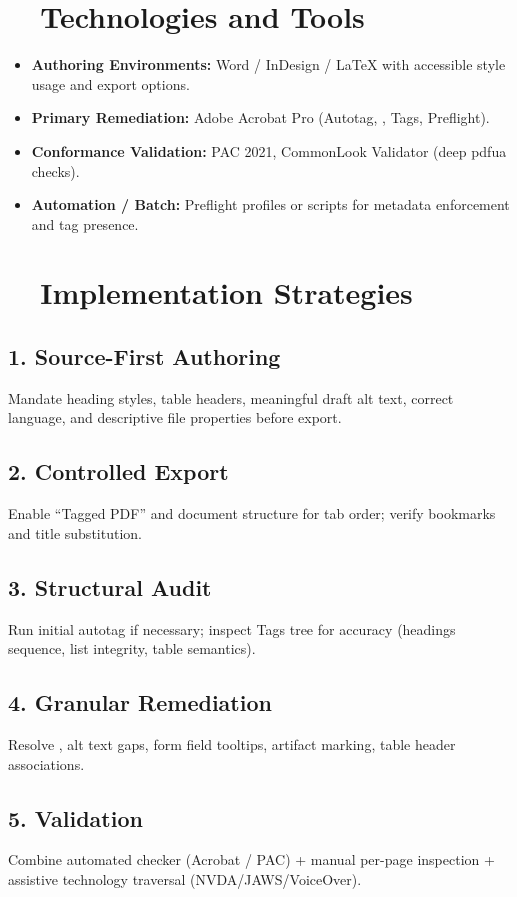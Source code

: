 \section{~~Technologies and Tools}\label{ch18:sec:technologies-tools}
\begin{itemize}
	\item \textbf{Authoring Environments:} Word / InDesign / LaTeX with accessible style usage and export options.
	\item \textbf{Primary Remediation:} Adobe Acrobat Pro (Autotag, , Tags, Preflight)\supercite{AdobeAccessGuide}.
	\item \textbf{Conformance Validation:} PAC 2021, CommonLook Validator (deep \gls{pdfua} checks)\supercite{PubComWCAGvsPDFUA}.
	\item \textbf{Automation / Batch:} Preflight profiles or scripts for metadata enforcement and tag presence.
\end{itemize}

\section{~~Implementation Strategies}\label{ch18:sec:implementation-strategies}
\subsection*{1. Source-First Authoring}
Mandate heading styles, table headers, meaningful draft alt text, correct language, and descriptive file properties before export.
\subsection*{2. Controlled Export}
Enable “Tagged PDF” and document structure for tab order; verify bookmarks and title substitution.
\subsection*{3. Structural Audit}
Run initial autotag if necessary; inspect Tags tree for accuracy (headings sequence, list integrity, table semantics).
\subsection*{4. Granular Remediation}
Resolve , alt text gaps, form field tooltips, artifact marking, table header associations.
\subsection*{5. Validation}
Combine automated checker (Acrobat / PAC) + manual per-page inspection + assistive technology traversal (NVDA/JAWS/VoiceOver).
